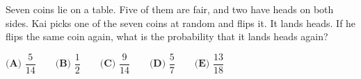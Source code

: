 Seven coins lie on a table. Five of them are fair, and two have heads on both sides. Kai picks one of the seven coins at random and flips it. It lands heads. If he flips the same coin again, what is the probability that it lands heads again?

$\textbf{(A) }\dfrac{5}{14}\qquad\textbf{(B) }\dfrac{1}{2}\qquad\textbf{(C) }\dfrac{9}{14}\qquad\textbf{(D) }\dfrac{5}{7}\qquad\textbf{(E) }\dfrac{13}{18}$
